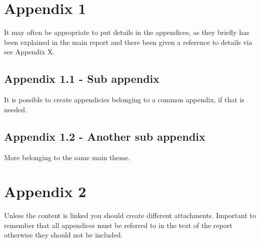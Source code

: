 \appendix

\chapter{Appendix 1} %
It may often be appropriate to put details in the appendices, as they briefly has been explained in the main report and there been given a reference to details via see Appendix X.

\begin{subappendices}

\section{Appendix 1.1 - Sub appendix}
It is possible to create appendicies belonging to a common appendix, if that is needed.

\section{Appendix 1.2 - Another sub appendix}
More belonging to the same main theme.

\end{subappendices}

\chapter{Appendix 2}
Unless the content is linked you should create different attachments. Important to remember that all appendices must be referred to in the text of the report otherwise they should not be included.
